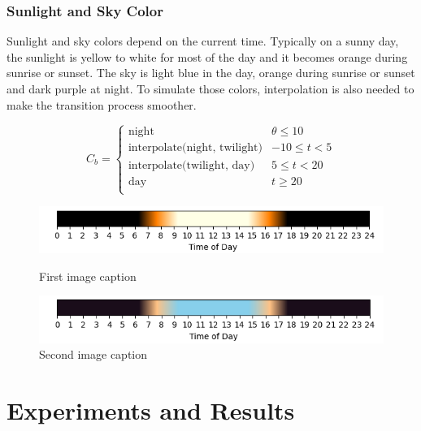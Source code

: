 \documentclass{article}
\begin{document}

\subsubsection {Sunlight and Sky Color}
Sunlight and sky colors depend on the current time. Typically on a sunny day, the sunlight is yellow
to white for most of the day and it becomes orange during sunrise or sunset. The sky is light blue
in the day, orange during sunrise or sunset and dark purple at night. To simulate those colors, 
interpolation is also needed to make the transition process smoother. 

\[
  C_{b}=
  \left\{
    \begin{array}{ll}
      \text{night} & \theta \leq 10 \\
      \text{interpolate(night, twilight)} &  -10 \leq t < 5 \\
      \text{interpolate(twilight, day)} &  5 \leq t < 20 \\
      \text{day} & t \geq 20 \\
    \end{array} 
  \right. 
\]




\begin{figure}[h]
  \centering
  \begin{minipage}{0.45\textwidth}
      \centering
      \includegraphics[width=\textwidth]{images/SunColor35N.png}
      \caption{First image caption}
      \label{fig:SunColor35N}
  \end{minipage}\hfill
  \begin{minipage}{0.45\textwidth}
      \centering
      \includegraphics[width=\textwidth]{images/SkyColor35N.png}
      \caption{Second image caption}
      \label{fig:SkyColor35N}
  \end{minipage}
\end{figure}


\section{Experiments and Results}
\end{document}
